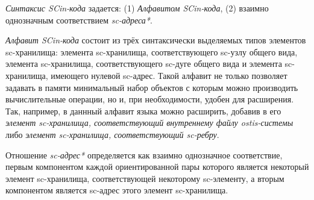 \textit{Синтаксис SCin-кода} задается: (1) \textit{Алфавитом SCin-кода}, (2) взаимно однозначным соответствием \textit{sc-адреса*}.

\begin{SCn}
\begin{scneqtoset}
    \begin{scnindent}
    \end{scnindent}
\end{scneqtoset}
\end{SCn}

\textit{Алфавит SCin-кода\scnsupergroupsign} состоит из трёх синтаксически выделяемых типов элементов sc-хранилища: элемента sc-хранилища, соответствующего sc-узлу общего вида, элемента sc-хранилища, соответствующего sc-дуге общего вида и элемента sc-хранилища, имеющего нулевой sc-адрес. Такой алфавит не только позволяет задавать в памяти минимальный набор объектов с которым можно производить вычислительные операции, но и, при необходимости, удобен для расширения. Так, например, в даннный алфавит языка можно расширить, добавив в его \textit{элемент sc-хранилища, соответствующий внутреннему файлу ostis-системы} либо \textit{элемент sc-хранилища, соответствующий sc-ребру}.

\begin{SCn}
\end{SCn}

Отношение \textit{sc-адрес*} определяется как взаимно однозначное соответствие, первым компонентом каждой ориентированной пары которого является некоторый элемент sc-хранилища, соответствующей некоторому sc-элементу, а вторым компонентом является sc-адрес этого элемент sc-хранилища.

\begin{SCn}
\end{SCn}

